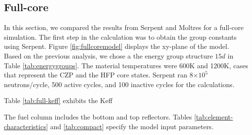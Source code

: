\documentclass[11pt,letterpaper]{article}
\begin{document}
\subsection{Full-core}

In this section, we compared the results from Serpent and Moltres for a full-core simulation.
The first step in the calculation was to obtain the group constants using Serpent.
Figure \ref{fig:fullcoremodel} displays the xy-plane of the model.
Based on the previous analysis, we chose a the energy group structure $15d$ in Table \ref{tab:energygroups}.
The material temperatures were 600K and 1200K, cases that represent the \gls{CZP} and the \gls{HFP} core states.
Serpent ran 8$\times 10^5$ neutrons/cycle, 500 active cycles, and 100 inactive cycles for the calculations.

Table \ref{tab:full-keff} exhibits the \gls{Keff}




The fuel column includes the bottom and top reflectors.
Tables \ref{tab:element-characteristics} and \ref{tab:compact} specify the model input parameters.

\end{document}
